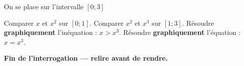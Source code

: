 \documentclass[12pt,a4paper]{exam}
\begin{document}
\vspace{5pt}
On se place sur l'intervalle $\left[0;3\right]$
\vspace{5pt}
\begin{questions}
    \question[1] Comparer $x$ et $x^2$ sur $\left[0;1\right]$.
    \question[1] Comparer $x^2$ et $x^3$ sur $\left[1;3\right]$.
    \question[2] Résoudre \textbf{graphiquement} l'inéquation : $x > x^3$.
    \question[2] Résoudre \textbf{graphiquement} l'équation : $x = x^3$.
\end{questions}

\noindent\hrulefill
\vspace{0.5cm}

\begin{center}
\textbf{Fin de l'interrogation — relire avant de rendre.}    
\end{center}
\end{document}

